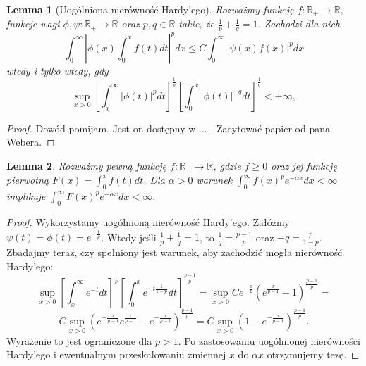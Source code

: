 \documentclass[licencjacka]{pracamgr}
\theoremstyle{definition}
\theoremstyle{definition}
\theoremstyle{plain}
\newtheorem{lemma}{Lemma}[section]
\theoremstyle{plain}
\begin{document}
\begin{lemma}[Uogólniona nierówność Hardy'ego]
    Rozważmy funkcję $f: \mathbb{R}_{+} \rightarrow \mathbb{R}$, funkcje-wagi
    $\phi, \psi: \mathbb{R}_{+} \rightarrow \mathbb{R}$ oraz $p, q \in
    \mathbb{R}$ takie, że $\frac{1}{p} + \frac{1}{q} = 1 $.  Zachodzi dla nich
$$
\int_0^\infty \left|
                \phi(x) \int_0^x f(t) dt
              \right|^p dx
\leq
C \int_0^\infty \left|
                    \psi(x)  f(x)
                \right|^p dx
$$
wtedy i tylko wtedy, gdy
$$
\sup_{x > 0}
\left[
\int_x^\infty  
   | \phi(t) |^p dt
\right]^{\frac{1}{p}}
\left[
\int_0^x
    | \phi(t) |^{-q} dt
\right]^{\frac{1}{q}} < + \infty,
$$
\end{lemma}
\begin{proof}
    Dowód pomijam. 
    Jest on dostępny w ... . Zacytować papier od pana Webera.
\end{proof}

\begin{lemma}
Rozważmy pewną funkcję $f: \mathbb{R}_{+} \rightarrow \mathbb{R}$, gdzie $f
\geq 0$ oraz jej funkcję pierwotną $F(x) = \int_0^{x} f(t) dt$. Dla $\alpha > 0$ warunek
$\int_0^\infty f(x)^p e^{-\alpha x}dx < \infty$ implikuje $\int_0^\infty
F(x)^pe^{- \alpha x}dx < \infty$.  \\
\end{lemma}
\begin{proof}
Wykorzystamy uogólnioną nierówność Hardy'ego.  Załóżmy $\psi(t) = \phi(t) =
e^{- \frac{t}{p} }$. Wtedy jeśli $\frac{1}{p} + \frac{1}{q} = 1 $, to
$\frac{1}{q} = \frac{p-1}{p}$ oraz $-q = \frac{p}{1-p}$.  Zbadajmy teraz, czy
spełniony jest warunek, aby zachodzić mogła nierówność Hardy'ego:
$$
\sup_{x > 0}
\left[
\int_x^\infty  
    e^{-t} dt
\right]^{\frac{1}{p}}
\left[
\int_0^x
    e^{-t \frac{1}{1-p}} dt
\right]^{\frac{p-1}{p}}
=
\sup_{x > 0}
    C
    e^{- \frac{x}{p}}
    \left(
        e^{\frac{x}{p-1}} - 1
    \right)^{\frac{p-1}{p}}
=
$$
$$
C
\sup_{x > 0}
    \left(
    e^{- \frac{x}{p-1}}
        e^{\frac{x}{p-1}} -
    e^{- \frac{x}{p-1}}
    \right)^{\frac{p-1}{p}}
=
C
\sup_{x > 0}
    \left(
        1 -
    e^{- \frac{x}{p-1}}
    \right)^{\frac{p-1}{p}}. 
$$
Wyrażenie to jest ograniczone dla $p> 1$. Po zastosowaniu uogólnionej
nierówności Hardy'ego i ewentualnym przeskalowaniu zmiennej $x$ do $\alpha x$
otrzymujemy tezę.
\end{proof}
\end{document}
